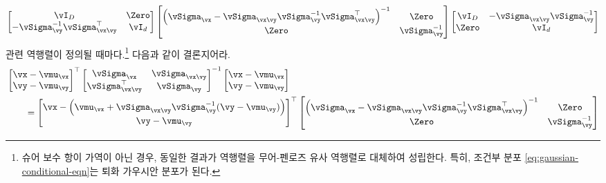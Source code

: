 \documentclass[../../book-main_ko.tex]{subfiles}
\begin{document}
\begin{exercise}
\begin{enumerate}
\begin{equation}
        \begin{bmatrix}
          \vI_D & \Zero\\
          -\vSigma_{\vy}^{-1}\vSigma_{\vx\vy}^\top & \vI_d
        \end{bmatrix}
        \begin{bmatrix}
          \left(\vSigma_{\vx} - \vSigma_{\vx\vy} \vSigma_{\vy}^{-1}
          \vSigma_{\vx\vy}^{\top}\right)^{-1} & \Zero \\
          \Zero & \vSigma_{\vy}^{-1}
        \end{bmatrix}
        \begin{bmatrix}
          \vI_D & -\vSigma_{\vx\vy}\vSigma_{\vy}^{-1} \\
          \Zero & \vI_d
        \end{bmatrix}
      \end{equation}
      관련 역행렬이 정의될 때마다.\footnote{슈어 보수 항이 가역이 아닌 경우, 동일한 결과가 역행렬을 무어-펜로즈 유사 역행렬로 대체하여 성립한다. 특히, 조건부 분포 \eqref{eq:gaussian-conditional-eqn}는 퇴화 가우시안 분포가 된다.}
      다음과 같이 결론지어라.
      \begin{align}
        &\begin{bmatrix}
          \vx-\vmu_{\vx} \\
          \vy-\vmu_{\vy}
        \end{bmatrix}^{\top}
        \begin{bmatrix}
          \vSigma_{\vx} & \vSigma_{\vx\vy} \\
          \vSigma_{\vx\vy}^\top & \vSigma_{\vy}
        \end{bmatrix}^{-1}
        \begin{bmatrix}
          \vx-\vmu_{\vx} \\
          \vy-\vmu_{\vy}
        \end{bmatrix}
        \\
        &\qquad=
        \begin{bmatrix}
          \vx - \left(\vmu_{\vx} + \vSigma_{\vx\vy}\vSigma_{\vy}^{-1}(\vy
          - \vmu_{\vy})\right) \\
          \vy - \vmu_{\vy}
        \end{bmatrix}^\top
        \begin{bmatrix}
          \left(\vSigma_{\vx} - \vSigma_{\vx\vy} \vSigma_{\vy}^{-1}
          \vSigma_{\vx\vy}^{\top}\right)^{-1} & \Zero \\
          \Zero & \vSigma_{\vy}^{-1}
        \end{bmatrix}

\end{align}
\end{enumerate}
\end{exercise}
\end{document}
